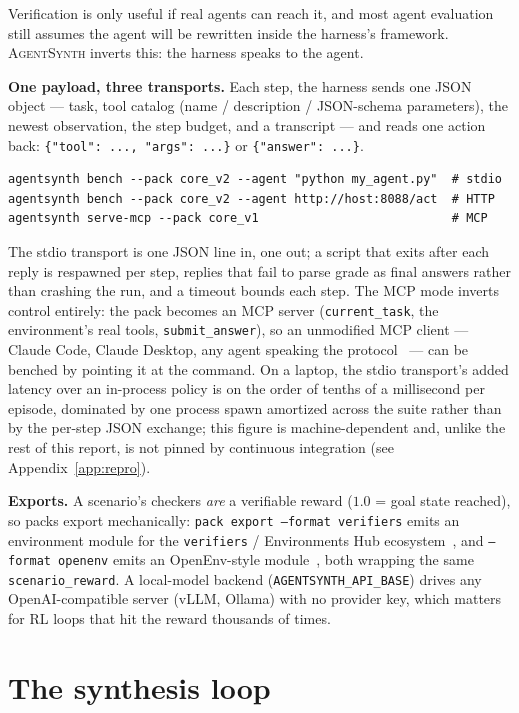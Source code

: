 \documentclass[11pt]{article}
\newcommand{\agentsynth}{\textsc{AgentSynth}}
\begin{document}
Verification is only useful if real agents can reach it, and most agent
evaluation still assumes the agent will be rewritten inside the harness's
framework. \agentsynth{} inverts this: the harness speaks to the agent.

\textbf{One payload, three transports.} Each step, the harness sends one JSON
object --- task, tool catalog (name / description / JSON-schema parameters),
the newest observation, the step budget, and a transcript --- and reads one
action back: \texttt{\{"tool": ..., "args": ...\}} or
\texttt{\{"answer": ...\}}.

\begin{lstlisting}
agentsynth bench --pack core_v2 --agent "python my_agent.py"  # stdio
agentsynth bench --pack core_v2 --agent http://host:8088/act  # HTTP
agentsynth serve-mcp --pack core_v1                           # MCP
\end{lstlisting}

The stdio transport is one JSON line in, one out; a script that exits after
each reply is respawned per step, replies that fail to parse grade as final
answers rather than crashing the run, and a timeout bounds each step. The MCP
mode inverts control entirely: the pack becomes an MCP server
(\texttt{current\_task}, the environment's real tools,
\texttt{submit\_answer}), so an unmodified MCP client --- Claude Code, Claude
Desktop, any agent speaking the protocol~\cite{mcp} --- can be benched by
pointing it at the command. On a laptop, the stdio transport's added latency
over an in-process policy is on the order of tenths of a millisecond per
episode, dominated by one process spawn amortized across the suite rather than
by the per-step JSON exchange; this figure is machine-dependent and, unlike
the rest of this report, is not pinned by continuous integration (see
Appendix~\ref{app:repro}).

\textbf{Exports.} A scenario's checkers \emph{are} a verifiable reward
($1.0$ = goal state reached), so packs export mechanically:
\texttt{pack export --format verifiers} emits an environment module for the
\texttt{verifiers} / Environments Hub ecosystem~\cite{verifiers}, and
\texttt{--format openenv} emits an OpenEnv-style module~\cite{openenv}, both
wrapping the same \texttt{scenario\_reward}. A local-model backend
(\texttt{AGENTSYNTH\_API\_BASE}) drives any OpenAI-compatible server (vLLM,
Ollama) with no provider key, which matters for RL loops that hit the reward
thousands of times.

\section{The synthesis loop}\label{sec:synthesis}
\end{document}
